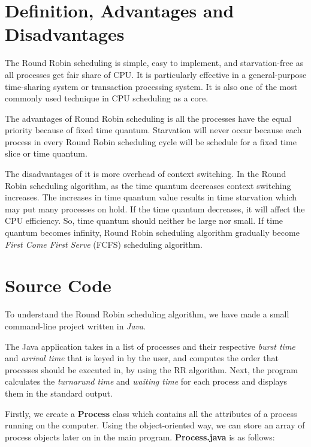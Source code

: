 \documentclass[12pt]{article}
\begin{document}
 \newpage 
 \section{Definition, Advantages and Disadvantages}

The Round Robin scheduling is simple, easy to implement, and starvation-free as
all processes get fair share of CPU. It is particularly effective in a
general-purpose time-sharing system or transaction processing system. It is also
one of the most commonly used technique in CPU scheduling as a core.

The advantages of Round Robin scheduling is all the processes have the equal
priority because of fixed time quantum. Starvation will never occur because each
process in every Round Robin scheduling cycle will be schedule for a fixed time
slice or time quantum.

The disadvantages of it is more overhead of context switching. In the Round
Robin scheduling algorithm, as the time quantum decreases context switching
increases. The increases in time quantum value results in time starvation which
may put many processes on hold. If the time quantum decreases, it will affect
the CPU efficiency. So, time quantum should neither be large nor small. If time
quantum becomes infinity, Round Robin scheduling algorithm gradually become
\textit{First Come First Serve} (FCFS) scheduling algorithm.

\newpage
\section{Source Code}

To understand the Round Robin scheduling algorithm, we have made a small
command-line project written in \textit{Java}.

The Java application takes in a list of processes and their respective
\textit{burst time} and \textit{arrival time} that is keyed in by the user, and
computes the order that processes should be executed in, by using the RR
algorithm. Next, the program calculates the \textit{turnarund time} and
\textit{waiting time} for each process and displays them in the standard output.

Firstly, we create a \textbf{Process} class which contains all the attributes of
a process running on the computer. Using the object-oriented way, we can store
an array of process objects later on in the main program. \textbf{Process.java}
is as follows:
\end{document}
